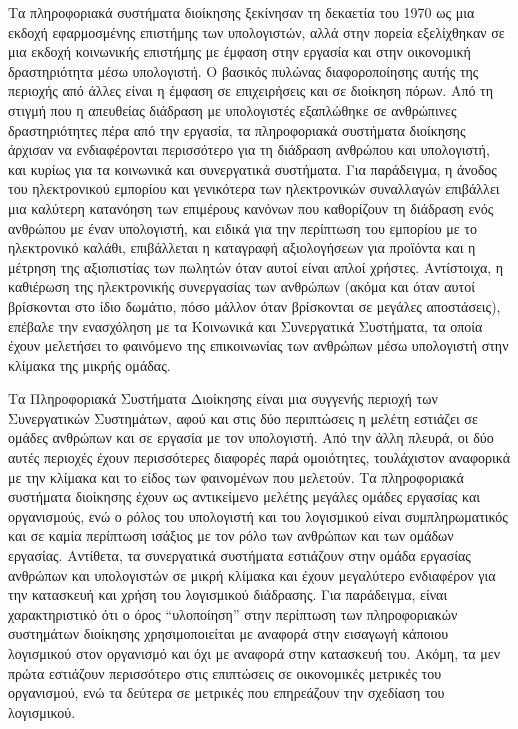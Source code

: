 \documentclass[
]{article}
\begin{document}
Τα πληροφοριακά συστήματα διοίκησης ξεκίνησαν τη δεκαετία του 1970 ως
μια εκδοχή εφαρμοσμένης επιστήμης των υπολογιστών, αλλά στην πορεία
εξελίχθηκαν σε μια εκδοχή κοινωνικής επιστήμης με έμφαση στην εργασία
και στην οικονομική δραστηριότητα μέσω υπολογιστή. Ο βασικός πυλώνας
διαφοροποίησης αυτής της περιοχής από άλλες είναι η έμφαση σε
επιχειρήσεις και σε διοίκηση πόρων. Από τη στιγμή που η απευθείας
διάδραση με υπολογιστές εξαπλώθηκε σε ανθρώπινες δραστηριότητες πέρα από
την εργασία, τα πληροφοριακά συστήματα διοίκησης άρχισαν να
ενδιαφέρονται περισσότερο για τη διάδραση ανθρώπου και υπολογιστή, και
κυρίως για τα κοινωνικά και συνεργατικά συστήματα. Για παράδειγμα, η
άνοδος του ηλεκτρονικού εμπορίου και γενικότερα των ηλεκτρονικών
συναλλαγών επιβάλλει μια καλύτερη κατανόηση των επιμέρους κανόνων που
καθορίζουν τη διάδραση ενός ανθρώπου με έναν υπολογιστή, και ειδικά για
την περίπτωση του εμπορίου με το ηλεκτρονικό καλάθι, επιβάλλεται η
καταγραφή αξιολογήσεων για προϊόντα και η μέτρηση της αξιοπιστίας των
πωλητών όταν αυτοί είναι απλοί χρήστες. Αντίστοιχα, η καθιέρωση της
ηλεκτρονικής συνεργασίας των ανθρώπων (ακόμα και όταν αυτοί βρίσκονται
στο ίδιο δωμάτιο, πόσο μάλλον όταν βρίσκονται σε μεγάλες αποστάσεις),
επέβαλε την ενασχόληση με τα Κοινωνικά και Συνεργατικά Συστήματα, τα
οποία έχουν μελετήσει το φαινόμενο της επικοινωνίας των ανθρώπων μέσω
υπολογιστή στην κλίμακα της μικρής ομάδας.

Τα Πληροφοριακά Συστήματα Διοίκησης είναι μια συγγενής περιοχή των
Συνεργατικών Συστημάτων, αφού και στις δύο περιπτώσεις η μελέτη εστιάζει
σε ομάδες ανθρώπων και σε εργασία με τον υπολογιστή. Από την άλλη
πλευρά, οι δύο αυτές περιοχές έχουν περισσότερες διαφορές παρά
ομοιότητες, τουλάχιστον αναφορικά με την κλίμακα και το είδος των
φαινομένων που μελετούν. Τα πληροφοριακά συστήματα διοίκησης έχουν ως
αντικείμενο μελέτης μεγάλες ομάδες εργασίας και οργανισμούς, ενώ ο ρόλος
του υπολογιστή και του λογισμικού είναι συμπληρωματικός και σε καμία
περίπτωση ισάξιος με τον ρόλο των ανθρώπων και των ομάδων εργασίας.
Αντίθετα, τα συνεργατικά συστήματα εστιάζουν στην ομάδα εργασίας
ανθρώπων και υπολογιστών σε μικρή κλίμακα και έχουν μεγαλύτερο
ενδιαφέρον για την κατασκευή και χρήση του λογισμικού διάδρασης. Για
παράδειγμα, είναι χαρακτηριστικό ότι ο όρος ``υλοποίηση'' στην περίπτωση
των πληροφοριακών συστημάτων διοίκησης χρησιμοποιείται με αναφορά στην
εισαγωγή κάποιου λογισμικού στον οργανισμό και όχι με αναφορά στην
κατασκευή του. Ακόμη, τα μεν πρώτα εστιάζουν περισσότερο στις επιπτώσεις
σε οικονομικές μετρικές του οργανισμού, ενώ τα δεύτερα σε μετρικές που
επηρεάζουν την σχεδίαση του λογισμικού.
\end{document}
